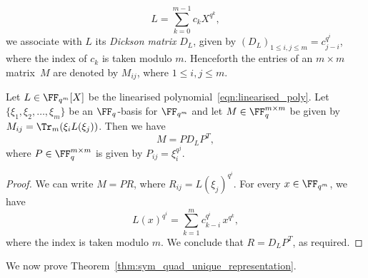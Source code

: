 \begin{equation}
L=\sum_{k=0}^{m-1}c_kX^{q^k},   \label{eqn:linearised_poly}
\end{equation}
we associate with $L$ its \emph{Dickson matrix} $D_L$, given by $(D_L)_{1\le i,j\le m}=c_{j-i}^{q^i}$, where the index of $c_k$ is taken modulo $m$. Henceforth the entries of an $m\times m$ matrix~$M$ are denoted by $M_{ij}$, where $1\le i,j\le m$.
\begin{lemma}
\label{lem:lin_poly_to_mat}
Let $L\in\FF_{q^m}[X]$ be the linearised polynomial~\eqref{eqn:linearised_poly}. Let $\{\xi_1,\xi_2,\dots,\xi_m\}$ be an $\FF_q$-basis for $\FF_{q^m}$ and let $M\in\FF_q^{m\times m}$ be given by  $M_{ij}=\Tr_m(\xi_iL(\xi_j))$. Then we have
\[
M=PD_LP^T,
\]
where $P\in\FF_q^{m\times m}$ is given by $P_{ij}=\xi_i^{q^j}$.
\end{lemma}
\begin{proof}
We can write $M=PR$, where $R_{ij}=L(\xi_j)^{q^i}$. For every $x\in\FF_{q^m}$, we have
\[
L(x)^{q^i}=\sum_{k=1}^mc_{k-i}^{q^i}\,x^{q^k},
\]
where the index is taken modulo $m$. We conclude that $R=D_LP^T$, as required.
\end{proof}
\par
We now prove Theorem~\ref{thm:sym_quad_unique_representation}.
